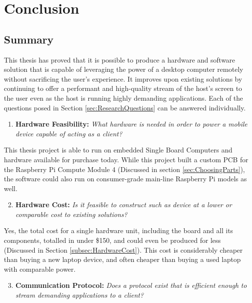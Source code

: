 \chapter{Conclusion}

\label{Chapter7}


\section{Summary}\label{sec:ConclusionSummary}

This thesis has proved that it is possible to produce a hardware and software solution that is capable of leveraging the power of a desktop computer remotely without sacrificing the user's experience.
It improves upon existing solutions by continuing to offer a performant and high-quality stream of the host's screen to the user even as the host is running highly demanding applications.
Each of the questions posed in Section \ref{sec:ResearchQuestions} can be answered individually.

\begin{enumerate}
  \setcounter{enumi}{0} %
  \item \textbf{Hardware Feasibility:} \emph{What hardware is needed in order to power a mobile device capable of acting as a client?}
\end{enumerate}

\noindent
This thesis project is able to run on embedded Single Board Computers and hardware available for purchase today.
While this project built a custom PCB for the Raspberry Pi Compute Module 4 (Discussed in section \ref{sec:ChoosingParts}), the software could also run on consumer-grade main-line Raspberry Pi models as well.

\begin{enumerate}
  \setcounter{enumi}{1} %
  \item \textbf{Hardware Cost:} \emph{Is it feasible to construct such as device at a lower or comparable cost to existing solutions?}
\end{enumerate}

\noindent
Yes, the total cost for a single hardware unit, including the board and all its components, totalled in under \$150, and could even be produced for less (Discussed in Section \ref{subsec:HardwareCost}).
This cost is considerably cheaper than buying a new laptop device, and often cheaper than buying a used laptop with comparable power.

\begin{enumerate}
  \setcounter{enumi}{2} %
  \item \textbf{Communication Protocol:} \emph{Does a protocol exist that is efficient enough to stream demanding applications to a client?}
\end{enumerate}

